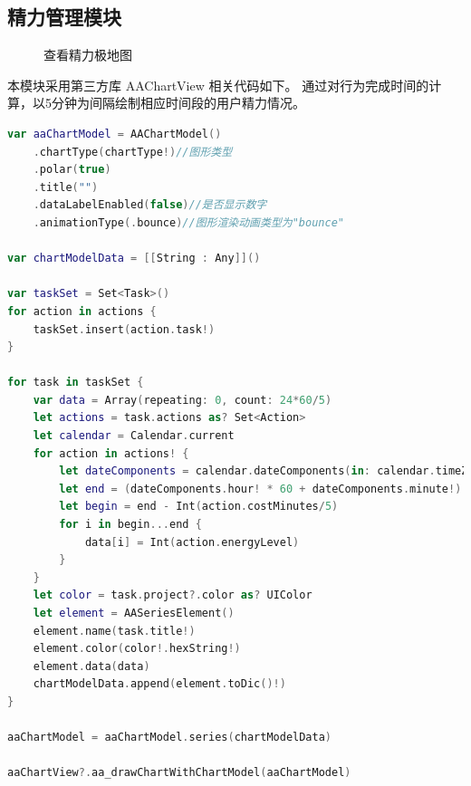 \subsection{精力管理模块}
\begin{figure}[H]
	\centering
	\caption{查看精力极地图}
\end{figure}
本模块采用第三方库 AAChartView 相关代码如下。
通过对行为完成时间的计算，以5分钟为间隔绘制相应时间段的用户精力情况。

\begin{lstlisting}[language={Swift}, caption={绘制极地图的代码}]
var aaChartModel = AAChartModel()
	.chartType(chartType!)//图形类型
	.polar(true)
	.title("")
	.dataLabelEnabled(false)//是否显示数字
	.animationType(.bounce)//图形渲染动画类型为"bounce"

var chartModelData = [[String : Any]]()

var taskSet = Set<Task>()
for action in actions {
	taskSet.insert(action.task!)
}

for task in taskSet {
	var data = Array(repeating: 0, count: 24*60/5)
	let actions = task.actions as? Set<Action>
	let calendar = Calendar.current
	for action in actions! {
		let dateComponents = calendar.dateComponents(in: calendar.timeZone, from: action.doneTime!)
		let end = (dateComponents.hour! * 60 + dateComponents.minute!) / 5
		let begin = end - Int(action.costMinutes/5)
		for i in begin...end {
			data[i] = Int(action.energyLevel)
		}
	}
	let color = task.project?.color as? UIColor
	let element = AASeriesElement()
	element.name(task.title!)
	element.color(color!.hexString!)
	element.data(data)
	chartModelData.append(element.toDic()!)
}

aaChartModel = aaChartModel.series(chartModelData)

aaChartView?.aa_drawChartWithChartModel(aaChartModel)
\end{lstlisting}


